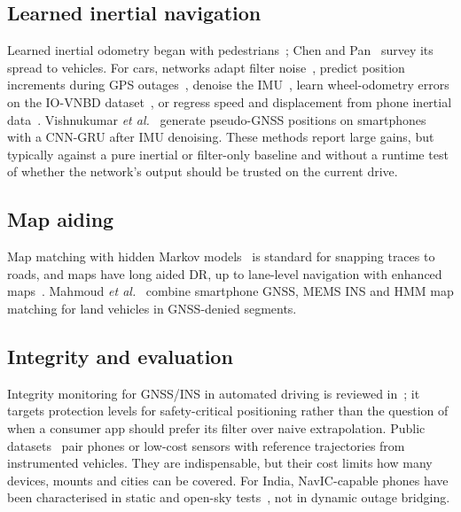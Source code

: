 \documentclass[conference]{IEEEtran}
\begin{document}
\subsection{Learned inertial navigation}
Learned inertial odometry began with pedestrians~\cite{chen2018ionet,herath2020ronin,liu2020tlio};
Chen and Pan~\cite{chen2024survey} survey its spread to vehicles. For cars,
networks adapt filter noise~\cite{brossard2020aiimu}, predict position
increments during GPS outages~\cite{liu2021ekfdl,liu2022bridge}, denoise the
IMU~\cite{damagatla2024denoise}, learn wheel-odometry errors on the IO-VNBD
dataset~\cite{onyekpe2021whonet,onyekpe2021iovnbd}, or regress speed and
displacement from phone inertial data~\cite{wang2023deepodometry,shin2025speed,xiao2025speed}.
Vishnukumar \emph{et al.}~\cite{vishnukumar2026denoiser} generate pseudo-GNSS
positions on smartphones with a CNN-GRU after IMU denoising. These methods report
large gains, but typically against a pure inertial or filter-only baseline and
without a runtime test of whether the network's output should be trusted on the
current drive.

\subsection{Map aiding}
Map matching with hidden Markov models~\cite{newson2009hmm} is standard for
snapping traces to roads, and maps have long aided DR, up to lane-level
navigation with enhanced maps~\cite{toledomoreo2009lane}. Mahmoud
\emph{et al.}~\cite{mahmoud2022mapmatch} combine smartphone GNSS, MEMS INS
and HMM map matching for land vehicles in GNSS-denied segments.

\subsection{Integrity and evaluation}
Integrity monitoring for GNSS/INS in automated driving is reviewed
in~\cite{jing2022integrity,viveiros2025integrityai}; it targets protection
levels for safety-critical positioning rather than the question of when a
consumer app should prefer its filter over naive extrapolation. Public
datasets~\cite{onyekpe2021iovnbd,hsu2023urbannav,wang2024whusmartphone,gao2025sensnav,fu2022sdc}
pair phones or low-cost sensors with reference trajectories from instrumented
vehicles. They are indispensable, but their cost limits how many devices,
mounts and cities can be covered. For India, NavIC-capable phones have been
characterised in static and open-sky tests~\cite{kuna2023navic,ainapure2025navic},
not in dynamic outage bridging.
\end{document}
